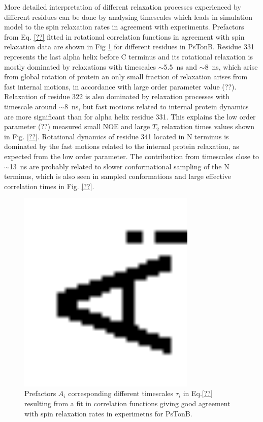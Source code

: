 \documentclass[pre,aps,floatfix,authordate1-4,twocolumn]{revtex4-1}
\begin{document}
More detailed interpretation of different relaxation processes experienced
by different residues can be done by analysing timescales which leads in simulation
model to the spin relaxation rates in agreement with experiments. Prefactors
from Eq. \ref{??} fitted in rotational correlation functions in agreement
with spin relaxation data are shown in Fig \ref{coeffsPLOT} for different residues
in PsTonB. Residue 331 represents the last alpha helix before C terminus and its rotational
relaxation is mostly dominated by relaxations with timescales $\sim$5.5~ns and $\sim$8~ns,
which arise from global rotation of protein an only small fraction of relaxation arises from
fast internal motions, in accordance with large order parameter value (??).
Relaxation of residue 322 is also dominated by relaxation processes with timescale
around $\sim$8~ns, but fast motions related to internal protein dynamics are more
significant than for alpha helix residue 331. This explains the low order parameter (??)
measured small NOE and large $T_2$ relaxation times values shown in Fig. \ref{??}.
Rotational dynamics of residue 341 located in N terminus is dominated by the fast
motions related to the internal protein relaxation, as expected from the low order
parameter. The contribution from timescales close to $\sim$13~ns are probably related
to slower conformational sampling of the N terminus, which is also seen in sampled
conformations and large effective correlation times in Fig. \ref{??}.
\begin{figure}[!h]
  \includegraphics[width=8.5cm]{../Figs/coeffsPLOT.eps}%
  \caption{Prefactors $A_i$ corresponding different timescales $\tau_i$ in Eq.\ref{??}
    resulting from a fit in correlation functions giving good agreement with spin
    relaxation rates in experimetns for PsTonB. 
    \label{coeffsPLOT}}%
\end{figure}
\end{document}
